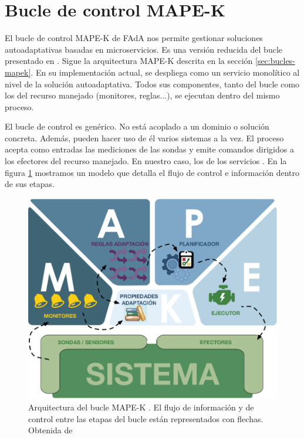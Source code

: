 \section{Bucle de control MAPE-K }

El bucle de control MAPE-K  de FAdA nos permite gestionar soluciones autoadaptativas basadas en microservicios. Es una versión reducida del bucle presentado en \cite{fonsServiciosAdaptivereadyPara2021}. Sigue la arquitectura MAPE-K descrita en la sección \ref{sec:bucles-mapek}. En su implementación actual, se despliega como un servicio monolítico al nivel de la solución autoadaptativa. Todos sus componentes, tanto del bucle como los del recurso manejado (monitores, reglas...), se ejecutan dentro del mismo proceso.

El bucle de control es genérico. No está acoplado a un dominio o solución concreta. Además, pueden hacer uso de él varios sistemas a la vez. El proceso acepta como entradas las mediciones de las sondas y emite comandos dirigidos a los efectores del recurso manejado. En nuestro caso, los  de los servicios . En la figura \ref{fig:bucle-mapek3} mostramos un modelo que detalla el flujo de control e información dentro de sus etapas.

\begin{figure}[htb]
  \centering
  \includegraphics[scale=1]{cap_introduccion/images/bucle-mape-k}
  \caption[Arquitectura del bucle MAPE-K . El flujo de información y de control entre las etapas del bucle están representados con flechas.]{Arquitectura del bucle MAPE-K . El flujo de información y de control entre las etapas del bucle están representados con flechas. Obtenida de \cite{fonsEspecificacionSistemasAutoadaptativos2021}}
  \label{fig:bucle-mapek3}
\end{figure}

